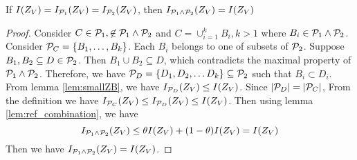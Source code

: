 \documentclass{article}
\begin{document}
\begin{theorem}\label{thm:lattice}
If $I(Z_V) = I_{\P_1}(Z_V) = I_{\P_2}(Z_V)$, then $I_{\P_1 \wedge \P_2}(Z_V)=I(Z_V) $
\end{theorem}
\begin{proof}
Consider $C\in \P_1, \not\in \P_1\wedge\P_2$ and $C = \cup_{i=1}^k B_i, k>1$ where $B_i \in \P_1 \wedge \P_2$.
Consider $\P_C = \{B_1, \dots, B_k\}$. Each $B_i$ belongs to one of subsets of $\P_2$. Suppose $B_1, B_2 \subseteq D \in \P_2$. Then $B_1\cup B_2 \subseteq D$,
which contradicts the maximal property of $\P_1\wedge \P_2$. Therefore, we have $\P_D = \{D_1, D_2, \dots D_k\}\subseteq \P_2$ such that $B_i \subset D_i$.
From lemma \ref{lem:smallZB}, we have $I_{\P_D}(Z_V) \leq I(Z_V)$. Since $\abs{\P_D} = \abs{\P_C}$, From the definition we have $I_{\P_C}(Z_V) \leq I_{\P_D}(Z_V) \leq I(Z_V)$.
Then using lemma \ref{lem:ref_combination}, we have
\begin{equation*}
I_{\P_1 \wedge \P_2}(Z_V) \leq \theta I(Z_V) + (1- \theta)I(Z_V) = I(Z_V)
\end{equation*} 
Then we have $I_{\P_1 \wedge \P_2}(Z_V)=I(Z_V)$.
\end{proof}
\end{document}
